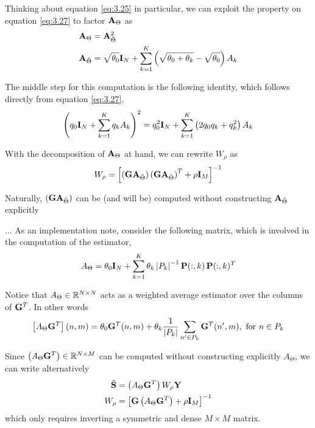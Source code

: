 Thinking about equation \eqref{eq:3.25} in particular, we can exploit the property on equation \eqref{eq:3.27} to factor $\mathbf{A}_\Theta$ as
\begin{align}
    \mathbf{A}_\Theta &= \mathbf{A}_{\tilde\Theta}^2 \\
    \mathbf{A}_{\tilde\Theta} &=
    \sqrt{\theta_0} \mathbf{I}_N + \sum_{k=1}^K \left( \sqrt{\theta_0+\theta_k}-\sqrt{\theta_0} \right) A_k
\end{align}

The middle step for this computation is the following identity, which follows directly from equation \eqref{eq:3.27},
\begin{equation}
    \left( q_0 \mathbf{I}_N + \sum_{k=1}^K q_k A_k \right)^2
    =
    q_0^2 \mathbf{I}_N + \sum_{k=1}^K \left( 2q_0 q_k + q_k^2 \right) A_k
\end{equation}

With the decomposition of $\mathbf{A}_\Theta$ at hand, we can rewrite $W_\rho$ as
\begin{equation}
    W_\rho =
    \left[  \left( \mathbf{G} \mathbf{A}_{\tilde{\Theta}} \right) \left( \mathbf{G} \mathbf{A}_{\tilde{\Theta}} \right)^T
    + \rho \mathbf{I}_M  \right]^{-1}
\end{equation}

Naturally, $\left( \mathbf{G} \mathbf{A}_{\tilde{\Theta}} \right)$ can be (and will be) computed without constructing ${\mathbf{A}_{\tilde{\Theta}}}$ explicitly

...
As an implementation note, consider the following matrix, which is involved in the computation of the estimator,
\begin{equation}
    A_\Theta =
    \theta_0 \mathbf{I}_N + \sum_{k=1}^K \theta_k \left| {P_k} \right|^{-1} 
    \mathbf{P}(:,k)\, \mathbf{P}(:,k)^T
\end{equation}

Notice that $A_\Theta\in \mathbb{R}^{N\times N}$ acts as a weighted average estimator over the columns of $\mathbf{G}^T$. In other words
\begin{equation}
    \left[ A_\Theta \mathbf{G}^T \right](n, m) =
    \theta_0 \mathbf{G}^T(n,m) + \theta_k \frac{1}{\left| {P_k} \right|} \sum_{n' \in P_k} \mathbf{G}^T(n',m), \text{ for } n\in P_k
\end{equation}

Since $\left( A_\Theta \mathbf{G}^T \right)\in \mathbb{R}^{N\times M}$ can be computed without constructing explicitly $A_\Theta$,
%
we can write alternatively
\begin{align}
    \hat{\mathbf{S}}
    &=
    \left( A_\Theta \mathbf{G}^T \right) W_\rho \mathbf{Y}
    \\
    W_\rho &=
    \left[  {\mathbf{G}} \left( A_\Theta \mathbf{G}^T \right)  + \rho \mathbf{I}_M  \right]^{-1}
\end{align}
which only requires inverting a symmetric and dense $M\times M$ matrix.

